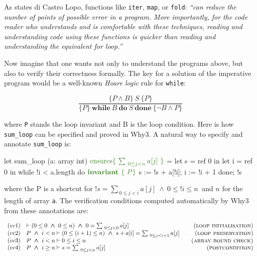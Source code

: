 \documentclass[a4paper,11pt,oneside]{article}
\theoremstyle{plain}
\newcommand{\bwedge}{\boldsymbol{~\wedge~}}
\begin{document}
	As states di Castro Lopo, functions like \texttt{iter}, \texttt{map}, or \texttt{fold}: \textit{``can reduce the number of points of possible error in a program. 
	More importantly, for the code reader who understands and is comfortable with these techniques, reading and understanding code using these functions is quicker than reading and understanding the equivalent for loop.''}
			
	Now imagine that one wants not only to understand the programs above, but also to verify their correctness formally. 
	The key for a solution of the imperative program would be a well-known \textit{Hoare logic} rule for \texttt{while}:
\begin{small}
$$\frac { \{P \land B \}\ S\ \{P\} }
{ \{P \}\ \textbf{while}\ B\ \textbf{do}\ S\ \textbf{done}\ \{\neg B \land P\}}$$
\end{small} 
where \texttt{P} stands the loop invariant and B is the loop condition.
Here is how \texttt{sum\_loop} can be specified and proved in Why3. 
A natural way to specify and annotate \texttt{sum\_loop} is:
%	
\begin{small}
	\begin{whycode}  
let sum_loop (a: array int) 	
  $\textcolor{OliveGreen}{\text{ensures}\{~\sum_{~0 \leq j < n} a[j]~\}}$ = 
  let s = ref 0 in
  let i = ref 0 in
  while !i < a.length do
    $\textcolor{OliveGreen}{\textbf{invariant }\{~P \}}$
    s := !s + a[!i];
    i := !i + 1
  done; !s 
 	\end{whycode}
 \end{small}
where the  P is a shortcut for $ !s = \sum_{~0\leq j < i} a[j] \bwedge 0 \leq !i \leq n~$ and $n$ for the length of array \texttt{a}. 
The verification conditions computed automatically by Why3 from these annotations are:
\begin{footnotesize}
\begin{displaymath}
\begin{array}{ll@{\hspace*{2em}}r}


(vc1)
	& \vdash (0 \leq 0 \bwedge 0 \leq n) 
\bwedge 0 = \sum_{~0\leq j < 0} a[j]	
	& \textsc{(loop initialisation)} \\


(vc2)
	& P \bwedge i < n \vdash
		(0 \leq (i+1) \leq n) 
		\bwedge s + a[i] = \sum_{~0 \leq j < i+1} a[j]
	& \textsc{(loop preservation)} \\

(vc3)
	& P \bwedge i < n \vdash 0 \leq i \leq n 
	& \textsc{(array bound check)} \\

(vc4)
	& P \bwedge i \geq n \vdash s = \sum_{~0 \leq j < n} a[j] 
	& \textsc{(postcondition)} 
\end{array}
\end{displaymath}
\end{footnotesize}
\end{document}
